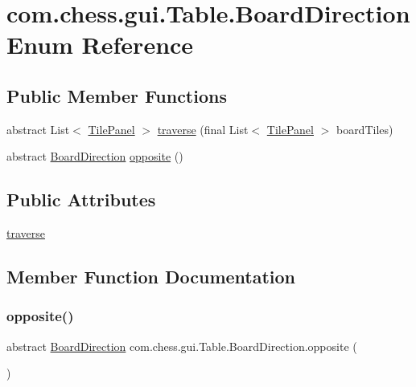 \hypertarget{enumcom_1_1chess_1_1gui_1_1_table_1_1_board_direction}{}\section{com.\+chess.\+gui.\+Table.\+Board\+Direction Enum Reference}
\label{enumcom_1_1chess_1_1gui_1_1_table_1_1_board_direction}
\subsection*{Public Member Functions}
\begin{DoxyCompactItemize}
\item 
abstract List$<$ \mbox{\hyperlink{classcom_1_1chess_1_1gui_1_1_table_1_1_tile_panel}{Tile\+Panel}} $>$ \mbox{\hyperlink{enumcom_1_1chess_1_1gui_1_1_table_1_1_board_direction_ae0e11e0f496f7793d6c8080604d8f19c}{traverse}} (final List$<$ \mbox{\hyperlink{classcom_1_1chess_1_1gui_1_1_table_1_1_tile_panel}{Tile\+Panel}} $>$ board\+Tiles)
\item 
abstract \mbox{\hyperlink{enumcom_1_1chess_1_1gui_1_1_table_1_1_board_direction}{Board\+Direction}} \mbox{\hyperlink{enumcom_1_1chess_1_1gui_1_1_table_1_1_board_direction_a3dbbb23d4b9ef1c57829842102b41345}{opposite}} ()
\end{DoxyCompactItemize}
\subsection*{Public Attributes}
\begin{DoxyCompactItemize}
\item 
\mbox{\hyperlink{enumcom_1_1chess_1_1gui_1_1_table_1_1_board_direction_a654521c2db76ad5b33154394a54bb8f9}{traverse}}
\end{DoxyCompactItemize}


\subsection{Member Function Documentation}
\mbox{\label{enumcom_1_1chess_1_1gui_1_1_table_1_1_board_direction_a3dbbb23d4b9ef1c57829842102b41345}} 
\subsubsection{\texorpdfstring{opposite()}{opposite()}}
{\footnotesize\ttfamily abstract \mbox{\hyperlink{enumcom_1_1chess_1_1gui_1_1_table_1_1_board_direction}{Board\+Direction}} com.\+chess.\+gui.\+Table.\+Board\+Direction.\+opposite (\begin{DoxyParamCaption}{ }\end{DoxyParamCaption})\hspace{0.3cm}{\ttfamily [abstract]}}


